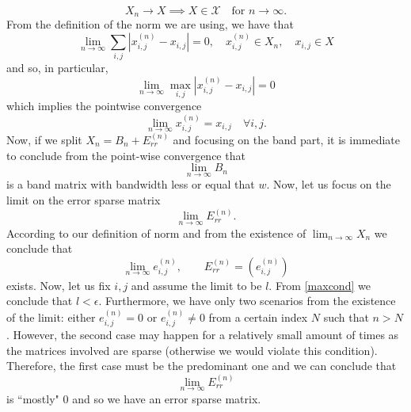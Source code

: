 \documentclass[11pt]{article}
\theoremstyle{plain}
\theoremstyle{remark}
\theoremstyle{definition}
\theoremstyle{plain}
\theoremstyle{plain}
\begin{document}
\[
X_n \to X \implies X \in \mathcal{X} \quad \text{for}\,\, n\to \infty.
\]
From the definition of the norm we are using, we have that
\[
   \lim_{n \to \infty} \sum_{i,j} |x^{(n)}_{i,j} -x_{i,j}|=0,\quad  x^{(n)}_{i,j}\in X_n, \quad x_{i,j}\in X
\]
and so, in particular,
\[ 
\lim_{n \to \infty} \max_{i,j} |x^{(n)}_{i,j} -x_{i,j}|=0 
\]
which implies the pointwise convergence
\[
\lim_{n \to \infty}  x^{(n)}_{i,j}=x_{i,j} \quad \forall i,j.
\]
Now, if we split $X_n=B_n+E^{(n)}_{rr}$ and focusing on the band part, it is immediate to conclude from the point-wise convergence that
\[
\lim_{n \to \infty} B_n
\]
is a band matrix with bandwidth less or equal that $w$. Now, let us focus on the limit on the error sparse matrix
\[
\lim_{n \to \infty} E^{(n)}_{rr}.
\]
According to our definition of norm and from the existence of $\lim_{n\to\infty} X_n$ we conclude that 
\[
\lim_{n \to \infty} e_{i,j}^{(n)}, \qquad E^{(n)}_{rr}=(e^{(n)}_{i,j})
\]
exists. Now, let us fix $i,j$ and assume the limit to be $l$. From \eqref{maxcond} we conclude that $l<\epsilon$. Furthermore, we have only two scenarios from the existence of the limit: either $e^{(n)}_{i,j}=0$ or $e^{(n)}_{i,j}\neq 0$ from a certain index $N$ such that $n>N$. However, the second case may happen for a relatively small amount of times as the matrices involved are sparse (otherwise we would violate this condition). Therefore, the first case must be the predominant one and we can conclude that 
\[
\lim_{n \to \infty} E^{(n)}_{rr}
\]
is ``mostly" $0$ and so we have an error sparse matrix.
\end{document}
